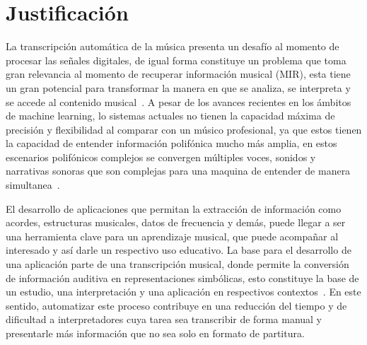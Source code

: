 \section{Justificación}

La transcripción automática de la música presenta un desafío al momento de procesar las señales digitales, de igual forma constituye un problema que toma gran relevancia al momento de recuperar información musical (MIR), esta tiene un gran potencial para transformar la manera en que se analiza, se interpreta y se accede al contenido musical~\cite{jamshidi2024machine}. A pesar de los avances recientes en los ámbitos de machine learning, lo sistemas actuales no tienen la capacidad máxima de precisión y flexibilidad al comparar con un músico profesional, ya que estos tienen la capacidad de entender información polifónica mucho más amplia, en estos escenarios polifónicos complejos se convergen múltiples voces, sonidos y narrativas sonoras que son complejas para una maquina de entender de manera simultanea~\cite{benetos2019automatic}.

El desarrollo de aplicaciones que permitan la extracción de información como acordes, estructuras musicales, datos de frecuencia y demás, puede llegar a ser una herramienta clave para un aprendizaje musical, que puede acompañar al interesado y así darle un respectivo uso educativo. La base para el desarrollo de una aplicación parte de una transcripción musical, donde permite la conversión de información auditiva en representaciones simbólicas, esto constituye la base de un estudio, una interpretación y una aplicación en respectivos contextos~\cite{jamshidi2024machine}. En este sentido, automatizar este proceso contribuye en una reducción del tiempo y de dificultad a interpretadores cuya tarea sea transcribir de forma manual y presentarle más información que no sea solo en formato de partitura.

